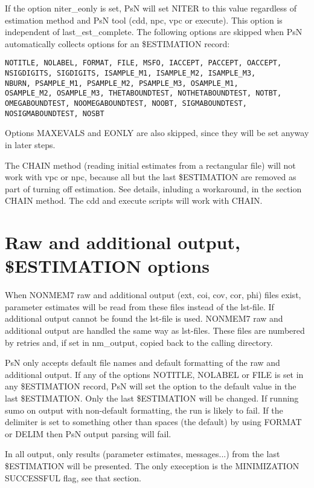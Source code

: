 If the option niter\_eonly is set, PsN will set NITER to this value regardless of estimation method and PsN tool (cdd, npc, vpc or execute). This option is independent of last\_est\_complete.
The following options are skipped when PsN automatically collects options for an \$ESTIMATION record:
\begin{verbatim}
NOTITLE, NOLABEL, FORMAT, FILE, MSFO, IACCEPT, PACCEPT, OACCEPT,
NSIGDIGITS, SIGDIGITS, ISAMPLE_M1, ISAMPLE_M2, ISAMPLE_M3,
NBURN, PSAMPLE_M1, PSAMPLE_M2, PSAMPLE_M3, OSAMPLE_M1,
OSAMPLE_M2, OSAMPLE_M3, THETABOUNDTEST, NOTHETABOUNDTEST, NOTBT,
OMEGABOUNDTEST, NOOMEGABOUNDTEST, NOOBT, SIGMABOUNDTEST,
NOSIGMABOUNDTEST, NOSBT
\end{verbatim}
Options MAXEVALS and EONLY are also skipped, since they will be set anyway in later steps.

The CHAIN method (reading initial estimates from a rectangular file) will not work with vpc or npc, because all but the last \$ESTIMATION are removed as part of turning off estimation. See details, inluding a workaround, in the section CHAIN method. The cdd and execute scripts will work with CHAIN.


\section{Raw and additional output, \$ESTIMATION options}

When NONMEM7 raw and additional output (ext, coi, cov, cor, phi) files exist, parameter estimates will be read from these files instead of the lst-file. If additional output cannot be found the lst-file is used. NONMEM7 raw and additional output are handled the same way as lst-files. These files are numbered by retries and, if set in nm\_output, copied back to the calling directory.

PsN only accepts default file names and default formatting of the raw and additional output. If any of the options NOTITLE, NOLABEL or FILE is set in any \$ESTIMATION record, PsN will set the option to the default value in the last \$ESTIMATION. Only the last \$ESTIMATION will be changed. If running sumo on output with non-default formatting, the run is likely to fail. If the delimiter is set to something other than spaces (the default) by using FORMAT or DELIM then PsN output parsing will fail.

In all output, only results (parameter estimates, messages...) from the last \$ESTIMATION will be presented. The only exeception is the MINIMIZATION SUCCESSFUL flag, see that section.

